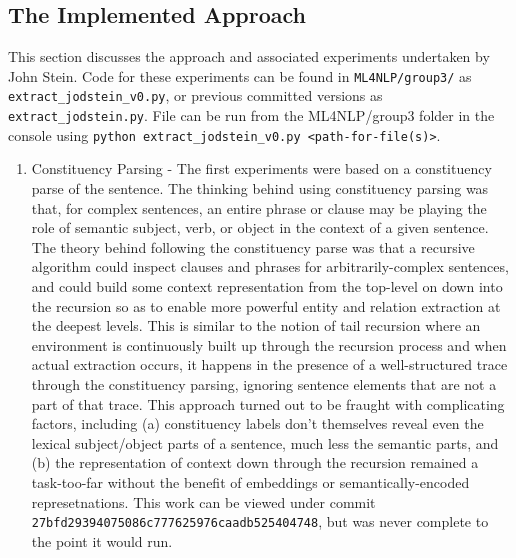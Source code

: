 \documentclass[11pt,letterpaper]{article}
\begin{document}
\subsection{The Implemented Approach}

This section discusses the approach and associated experiments undertaken by John Stein.  Code for these experiments can be found in \texttt{ML4NLP/group3/} as \texttt{extract\_jodstein\_v0.py}, or previous committed versions as \texttt{extract\_jodstein.py}.  File can be run from the ML4NLP/group3 folder in the console using \texttt{python extract\_jodstein\_v0.py <path-for-file(s)>}.

\begin{enumerate}

    \item Constituency Parsing - The first experiments were based on a constituency parse of the sentence.  The thinking behind using constituency parsing was that, for complex sentences, an entire phrase or clause may be playing the role of semantic subject, verb, or object in the context of a given sentence.  The theory behind following the constituency parse was that a recursive algorithm could inspect clauses and phrases for arbitrarily-complex sentences, and could build some context representation from the top-level on down into the recursion so as to enable more powerful entity and relation extraction at the deepest levels.  This is similar to the notion of tail recursion where an environment is continuously built up through the recursion process and when actual extraction occurs, it happens in the presence of a well-structured trace through the constituency parsing, ignoring sentence elements that are not a part of that trace.  This approach turned out to be fraught with complicating factors, including (a) constituency labels don't themselves reveal even the lexical subject/object parts of a sentence, much less the semantic parts, and (b) the representation of context down through the recursion remained a task-too-far without the benefit of embeddings or semantically-encoded represetnations.  This work can be viewed under commit \texttt{27bfd29394075086c777625976caadb525404748}, but was never complete to the point it would run.
    

\end{enumerate}
\end{document}
